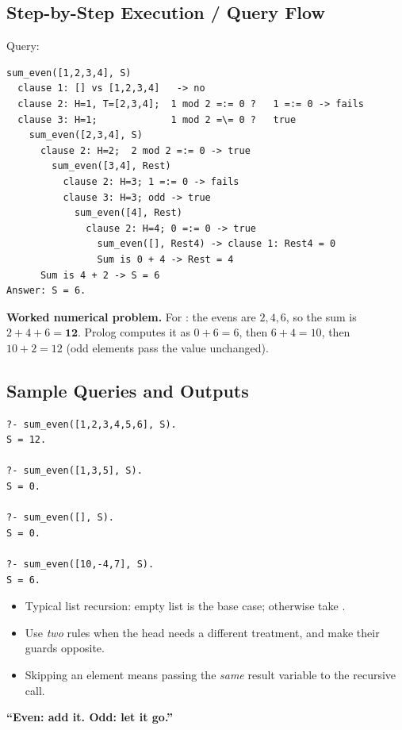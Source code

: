 \documentclass[11pt,a4paper]{article}
\newcommand{\pred}[1]{\texttt{\detokenize{#1}}}
\begin{document}
\subsection{Step-by-Step Execution / Query Flow}
Query: \pred{?- sum_even([1,2,3,4], S).}

\begin{lstlisting}[style=tr]
sum_even([1,2,3,4], S)
  clause 1: [] vs [1,2,3,4]   -> no
  clause 2: H=1, T=[2,3,4];  1 mod 2 =:= 0 ?   1 =:= 0 -> fails
  clause 3: H=1;             1 mod 2 =\= 0 ?   true
    sum_even([2,3,4], S)
      clause 2: H=2;  2 mod 2 =:= 0 -> true
        sum_even([3,4], Rest)
          clause 2: H=3; 1 =:= 0 -> fails
          clause 3: H=3; odd -> true
            sum_even([4], Rest)
              clause 2: H=4; 0 =:= 0 -> true
                sum_even([], Rest4) -> clause 1: Rest4 = 0
                Sum is 0 + 4 -> Rest = 4
      Sum is 4 + 2 -> S = 6
Answer: S = 6.
\end{lstlisting}

\textbf{Worked numerical problem.} For \pred{[1,2,3,4,5,6]}: the evens are $2, 4, 6$, so the sum is $2+4+6 = \mathbf{12}$. Prolog computes it as $0 + 6 = 6$, then $6+4=10$, then $10+2=12$ (odd elements pass the value unchanged).

\subsection{Sample Queries and Outputs}
\begin{lstlisting}[style=tr]
?- sum_even([1,2,3,4,5,6], S).
S = 12.

?- sum_even([1,3,5], S).
S = 0.

?- sum_even([], S).
S = 0.

?- sum_even([10,-4,7], S).
S = 6.
\end{lstlisting}

\begin{keybox}
\begin{itemize}[leftmargin=*]
  \item Typical list recursion: empty list is the base case; otherwise take \pred{[H|T]}.
  \item Use \emph{two} rules when the head needs a different treatment, and make their guards opposite.
  \item Skipping an element means passing the \emph{same} result variable to the recursive call.
\end{itemize}
\end{keybox}
\begin{mnbox}
\textbf{``Even: add it. Odd: let it go.''}
\end{mnbox}
\end{document}
